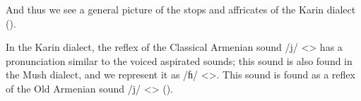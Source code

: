 And thus we see a general picture of the stops and affricates of the Karin dialect ().

\begin{table}[H]
	\caption{Voiced aspirated stops and affricates in the Karin dialect}\label{tab:Karin:phono:segment:cons:voice:voiceaspriate}\centering 
{}
\end{table}


In the Karin dialect, the reflex of the Classical Armenian sound /j/ <> has a pronunciation similar to the voiced aspirated sounds; this sound is also found in the Mush dialect, and we represent it as /ɦ/ <>. This sound is found as a reflex of the Old Armenian sound /j/ <> ().




